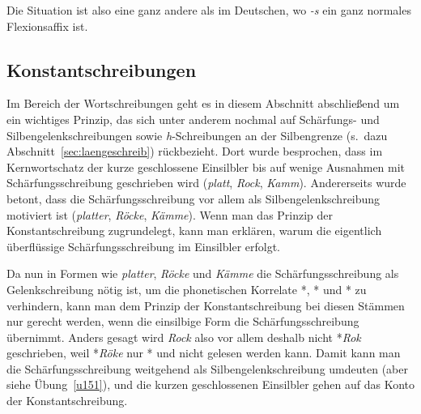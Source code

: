 \begin{exe}
  \ex\label{ex:msschr017} 
  \begin{xlist}
  \end{xlist}
\end{exe}

Die Situation ist also eine ganz andere als im Deutschen, wo \textit{-s} ein ganz normales Flexionsaffix ist.

\subsection{Konstantschreibungen}

\label{sec:konstanz}

Im Bereich der Wortschreibungen geht es in diesem Abschnitt abschließend um ein wichtiges Prinzip, das sich unter anderem nochmal auf Schärfungs- und Silbengelenkschreibungen sowie \textit{h}-Schreibungen an der Silbengrenze (s.\ dazu Abschnitt~\ref{sec:laengeschreib}) rückbezieht.
Dort wurde besprochen, dass im Kernwortschatz der kurze geschlossene Einsilbler bis auf wenige Ausnahmen mit Schärfungsschreibung geschrieben wird (\textit{platt}, \textit{Rock}, \textit{Kamm}).
Andererseits wurde betont, dass die Schärfungsschreibung vor allem als Silbengelenkschreibung motiviert ist (\textit{platter}, \textit{Röcke}, \textit{Kämme}).
Wenn man das Prinzip der Konstantschreibung zugrundelegt, kann man erklären, warum die eigentlich überflüssige Schärfungsschreibung im Einsilbler erfolgt.


Da nun in Formen wie \textit{platter}, \textit{Röcke} und \textit{Kämme} die Schärfungsschreibung als Gelenkschreibung nötig ist, um die phonetischen Korrelate *\textipa{[pla:t5]}, *\textipa{[r\o:k@]} und *\textipa{[kE:m@]} zu verhindern, kann man dem Prinzip der Konstantschreibung bei diesen Stämmen nur gerecht werden, wenn die einsilbige Form die Schärfungsschreibung übernimmt.
Anders gesagt wird \textit{Rock} also vor allem deshalb nicht *\textit{Rok} geschrieben, weil *\textit{Röke} nur *\textipa{[r\o:k@]} und nicht \textipa{[r{\oe}\Sgel{k}@]} gelesen werden kann.
Damit kann man die Schärfungsschreibung weitgehend als Silbengelenkschreibung umdeuten (aber siehe Übung~\ref{u151}), und die kurzen geschlossenen Einsilbler gehen auf das Konto der Konstantschreibung.

